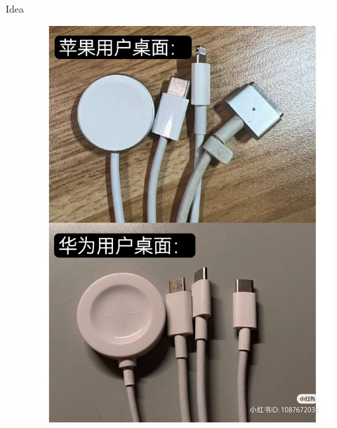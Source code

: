 \begin{frame}{Idea}
    \begin{figure}[h]
        \centering
        \begin{minipage}{0.48\textwidth}
            \centering
            \includegraphics[scale=0.135]{img/interface1.jpg}
        \end{minipage}
        \begin{minipage}{0.48\textwidth}
            \centering

\end{minipage}
\end{figure}
\end{frame}
